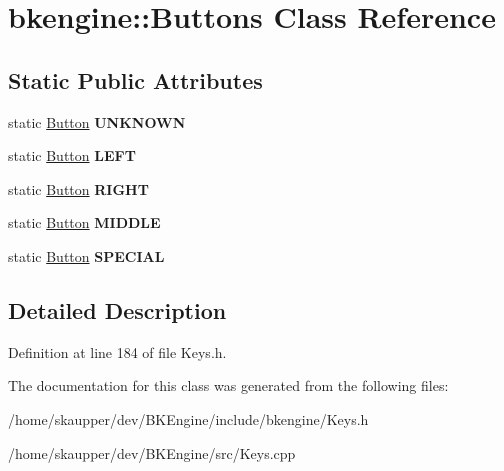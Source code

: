 \hypertarget{classbkengine_1_1Buttons}{}\section{bkengine\+:\+:Buttons Class Reference}
\label{classbkengine_1_1Buttons}
\subsection*{Static Public Attributes}
\begin{DoxyCompactItemize}
\item 
\mbox{\label{classbkengine_1_1Buttons_ab1fddb89d67c630a0f7d617905ca7277}} 
static \hyperlink{classbkengine_1_1Button}{Button} {\bfseries U\+N\+K\+N\+O\+WN}
\item 
\mbox{\label{classbkengine_1_1Buttons_a63338fac460ba72b47d48e31fb0a19fe}} 
static \hyperlink{classbkengine_1_1Button}{Button} {\bfseries L\+E\+FT}
\item 
\mbox{\label{classbkengine_1_1Buttons_a4017a23786d5f14a2fe54ed6bde537c7}} 
static \hyperlink{classbkengine_1_1Button}{Button} {\bfseries R\+I\+G\+HT}
\item 
\mbox{\label{classbkengine_1_1Buttons_a753d46b26d0911ed56d9cb46ae7e385a}} 
static \hyperlink{classbkengine_1_1Button}{Button} {\bfseries M\+I\+D\+D\+LE}
\item 
\mbox{\label{classbkengine_1_1Buttons_a7d39cae81f36e23e27a270115f08e703}} 
static \hyperlink{classbkengine_1_1Button}{Button} {\bfseries S\+P\+E\+C\+I\+AL}
\end{DoxyCompactItemize}


\subsection{Detailed Description}


Definition at line 184 of file Keys.\+h.



The documentation for this class was generated from the following files\+:\begin{DoxyCompactItemize}
\item 
/home/skaupper/dev/\+B\+K\+Engine/include/bkengine/Keys.\+h\item 
/home/skaupper/dev/\+B\+K\+Engine/src/Keys.\+cpp\end{DoxyCompactItemize}
